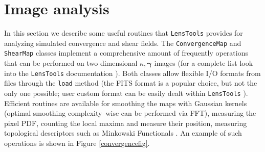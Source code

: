 \documentclass[reprint,aps,prd,superscriptaddress,showkeys,showpacs]{revtex4-1}
\newcommand{\ttt}[1]{\texttt{#1}}
\newcommand{\LT}{\texttt{LensTools} }
\begin{document}
\section{Image analysis}
%
In this section we describe some useful routines that \LT provides for analyzing simulated convergence and shear fields. The \ttt{ConvergenceMap} and \ttt{ShearMap} classes implement a comprehensive amount of frequently operations that can be performed on two dimensional $\kappa,\pmb{\gamma}$ images (for a complete list look into the \LT documentation \citep{lenstoolsdocs}). Both classes allow flexible I/O formats from files through the \ttt{load} method (the FITS format \citep{cfitsio} is a popular choice, but not the only one possible; user custom format can be easily dealt within \LT). Efficient routines are available for smoothing the maps with Gaussian kernels (optimal smoothing complexity--wise can be performed via FFT), measuring the pixel PDF, counting the local maxima and measure their position, measuring topological descriptors such as Minkowski Functionals \citep{MatsubaraMink}. An example of such operations is shown in Figure \ref{convergencefig}.   
\end{document}
